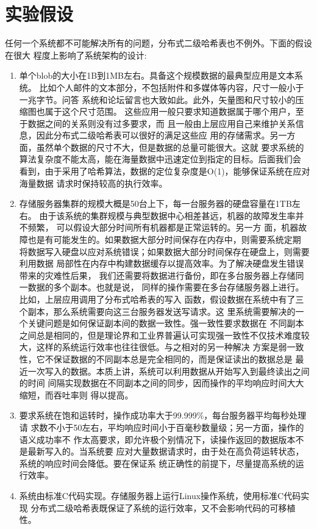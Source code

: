 \section{实验假设}\label{section:assumption}
任何一个系统都不可能解决所有的问题，分布式二级哈希表也不例外。下面的假设在很大
程度上影响了系统架构的设计:
\begin{enumerate}
  \item 单个blob的大小在1B到1MB左右。具备这个规模数据的最典型应用是文本系统。
  比如个人邮件的文本部分，不包括附件和多媒体等内容，尺寸一般小于一兆字节。问答
  系统和论坛留言也大致如此。此外，矢量图和尺寸较小的压缩图也属于这个尺寸范围。
  这些应用一般只要求知道数据属于哪个用户，至于数据之间的关系则没有过多要求，而
  且一般由上层应用自己来维护关系信息，因此分布式二级哈希表可以很好的满足这些应
  用的存储需求。另一方面，虽然单个数据的尺寸不大，但是数据的总量可能很大。这就
  要求系统的算法复杂度不能太高，能在海量数据中迅速定位到指定的目标。后面我们会
  看到，由于采用了哈希算法，数据的定位复杂度是O(1)，能够保证系统在应对海量数据
  请求时保持较高的执行效率。
  \item 存储服务器集群的规模大概是50台上下，每一台服务器的硬盘容量在1TB左右。
  由于该系统的集群规模与典型数据中心相差甚远，机器的故障发生率并不频繁，
  \cite{hastorun2007dynamo}可以假设大部分时间所有机器都是正常运转的。另一方
  面，机器故障也是有可能发生的。如果数据大部分时间保存在内存中，则需要系统定期
  将数据写入硬盘以应对系统错误；如果数据大部分时间保存在硬盘上，则需要利用数据
  局部性在内存中构建数据缓存以提高效率。为了解决硬盘发生错误带来的灾难性后果，
  我们还需要将数据进行备份，即在多台服务器上存储同一数据的多个副本。也就是说，
  同样的操作需要在多台存储服务器上进行。比如，上层应用调用了分布式哈希表的写入
  函数，假设数据在系统中有了三个副本，那么系统需要向这三台服务器发送写请求。这
  里系统需要解决的一个关键问题是如何保证副本间的数据一致性。强一致性要求数据在
  不同副本之间总是相同的，但是理论界和工业界普遍认可实现强一致性不仅技术难度较
  大，这样的系统运行效率也往往很低。\cite{fox1997cluster}与之相对的另一种解决
  方案是弱一致性，它不保证数据的不同副本总是完全相同的，而是保证读出的数据总是
  最近一次写入的数据。本质上讲，系统可以利用数据从开始写入到最终读出之间的时间
  间隔实现数据在不同副本之间的同步，因而操作的平均响应时间大大缩短，而吞吐率则
  得以提高。
  \item 要求系统在饱和运转时，操作成功率大于99.999\%，每台服务器平均每秒处理请
  求数不小于50左右，平均响应时间小于百毫秒数量级；另一方面，操作的语义成功率不
  作太高要求，即允许极个别情况下，读操作返回的数据版本不是最新写入的。当系统要
  应对大量数据请求时，由于处在高负荷运转状态，系统的响应时间会降低。要在保证系
  统正确性的前提下，尽量提高系统的运行效率。
  \item 系统由标准C代码实现。存储服务器上运行Linux操作系统，使用标准C代码实现
  分布式二级哈希表既保证了系统的运行效率，又不会影响代码的可移植性。
  
\end{enumerate}
